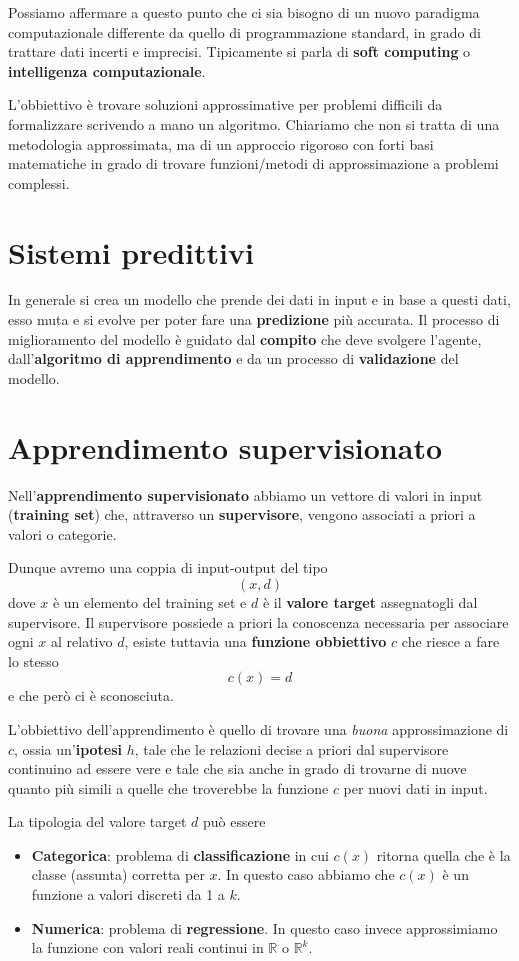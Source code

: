 Possiamo affermare a questo punto che ci sia bisogno di un nuovo paradigma computazionale differente da quello di
programmazione standard, in grado di trattare dati incerti e imprecisi. Tipicamente si parla di \textbf{soft computing} o
\textbf{intelligenza computazionale}.

L'obbiettivo \`e trovare soluzioni approssimative per problemi difficili da formalizzare scrivendo a mano un algoritmo.
Chiariamo che non si tratta di una metodologia approssimata, ma di un approccio rigoroso con forti basi
matematiche in grado di trovare funzioni/metodi di approssimazione a problemi complessi.

\section{Sistemi predittivi}
In generale si crea un modello che prende dei dati in input e in base a questi dati, esso muta e si evolve per poter
fare una \textbf{predizione} pi\`u accurata. Il processo di miglioramento del modello \`e guidato dal \textbf{compito}
che deve svolgere l'agente, dall'\textbf{algoritmo di apprendimento} e da un processo di \textbf{validazione} del modello.

\section{Apprendimento supervisionato}
Nell'\textbf{apprendimento supervisionato} abbiamo un vettore di valori in input (\textbf{training set}) che, attraverso
un \textbf{supervisore}, vengono associati a priori a valori o categorie.

Dunque avremo una coppia di input-output del tipo
\[ (x, d) \]
dove $x$ \`e un elemento del training set e $d$ \`e il \textbf{valore target} assegnatogli dal supervisore.
Il supervisore possiede a priori la conoscenza necessaria per associare ogni $x$ al relativo $d$, esiste tuttavia una
\textbf{funzione obbiettivo} $c$ che riesce a fare lo stesso
\[ c(x) = d \]
e che per\`o ci \`e sconosciuta.

L'obbiettivo dell'apprendimento \`e quello di trovare una \emph{buona} approssimazione di $c$, ossia un'\textbf{ipotesi}
$h$, tale che le relazioni decise a priori dal supervisore continuino ad essere vere e tale che sia anche in grado di
trovarne di nuove quanto pi\`u simili a quelle che troverebbe la funzione $c$ per nuovi dati in input.

La tipologia del valore target $d$ pu\`o essere
\begin{itemize}
	\item \textbf{Categorica}: problema di \textbf{classificazione} in cui $c(x)$ ritorna quella che \`e la classe
	      (assunta) corretta per $x$. In questo caso abbiamo che $c(x)$ \`e un funzione a valori discreti da 1 a $k$.
	\item \textbf{Numerica}: problema di \textbf{regressione}. In questo caso invece approssimiamo la funzione con
	      valori reali continui in $\mathbb{R}$ o $\mathbb{R}^k$.
\end{itemize}

